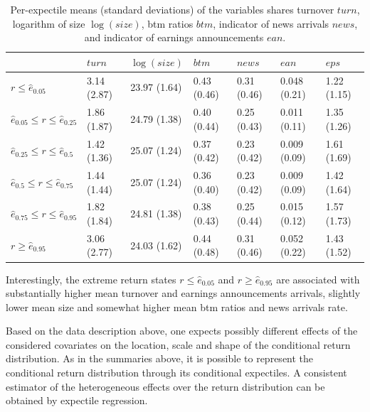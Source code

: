 \documentclass[11pt]{article}
\begin{document}
\begin{table}[h!]

\caption{\label{tab:table05}Per-expectile means (standard deviations) of the variables shares turnover $turn$, logarithm of size $\log(size)$, btm ratios $btm$, indicator of news arrivals $news$, and indicator of earnings announcements $ean$.}
\centering
\begin{tabular}[t]{l|l|l|l|l|l|l}
\hline
  & $turn$ & $\log(size)$ & $btm$ & $news$ & $ean$&$eps$\\
\hline
{\scriptsize{$r\leq \hat e_{ 0.05 }$}} & 3.14 (2.87) & 23.97 (1.64) & 0.43 (0.46) & 0.31 (0.46) & 0.048 (0.21) & 1.22 (1.15)\\
\hline
{\scriptsize{$\hat e_{ 0.05 }\leq r\leq \hat e_{ 0.25 }$}} & 1.86 (1.87) & 24.79 (1.38) & 0.40 (0.44) & 0.25 (0.43) & 0.011 (0.11) & 1.35 (1.26)\\
\hline
{\scriptsize{$\hat e_{ 0.25}\leq r\leq \hat e_{ 0.5 }$}} & 1.42 (1.36) & 25.07 (1.24) & 0.37 (0.42) & 0.23 (0.42) & 0.009 (0.09) & 1.61 (1.69)\\
\hline
{\scriptsize{$\hat e_{ 0.5 }\leq r\leq \hat e_{ 0.75 }$ }}& 1.44 (1.44) & 25.07 (1.24) & 0.36 (0.40) & 0.23 (0.42) & 0.009 (0.09) & 1.42 (1.64)\\
\hline
{\scriptsize{$\hat e_{ 0.75 }\leq r\leq \hat e_{ 0.95 }$}} & 1.82 (1.84) & 24.81 (1.38) & 0.38 (0.43) & 0.25 (0.44) & 0.015 (0.12) & 1.57 (1.73)\\
\hline
{\scriptsize{$r\geq \hat e_{ 0.95 }$}} & 3.06 (2.77) & 24.03 (1.62) & 0.44 (0.48) & 0.31 (0.46) & 0.052 (0.22) & 1.43 (1.52)\\
\hline
\end{tabular}
\end{table}

Interestingly, the extreme return states \(r\leq \hat e_{0.05}\) and \(r\geq \hat e_{0.95}\) are associated with substantially higher mean turnover and earnings announcements arrivals, slightly lower mean size and somewhat higher mean btm ratios and news arrivals rate.


Based on the data description above, one expects possibly different effects of the considered covariates on the location, scale and shape of the conditional return distribution. As in the summaries above, it is possible to represent the conditional return distribution through its conditional expectiles. A consistent estimator of the heterogeneous effects over the return distribution can be obtained by expectile regression.
\end{document}
